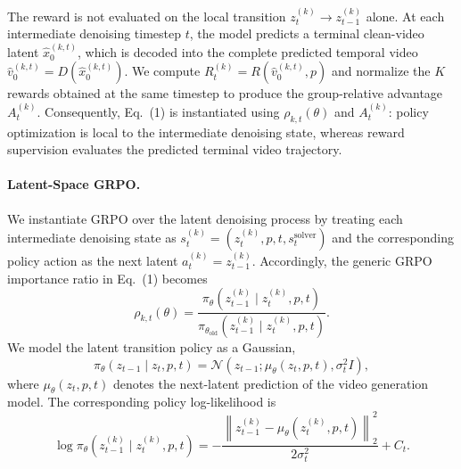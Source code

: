 \documentclass{article}
\begin{document}
The reward is not evaluated on the local transition
$z_t^{(k)}\rightarrow z_{t-1}^{(k)}$ alone. At each intermediate
denoising timestep $t$, the model predicts a terminal clean-video latent
$\hat{x}_0^{(k,t)}$, which is decoded into the complete predicted temporal
video $\hat{v}_0^{(k,t)}=D(\hat{x}_0^{(k,t)})$. We compute
$R_t^{(k)}=R(\hat{v}_0^{(k,t)},p)$ and normalize the $K$ rewards obtained
at the same timestep to produce the group-relative advantage
$A_t^{(k)}$. Consequently, Eq.~(1) is instantiated using
$\rho_{k,t}(\theta)$ and $A_t^{(k)}$: policy optimization is local to the
intermediate denoising state, whereas reward supervision evaluates the
predicted terminal video trajectory.

\paragraph{Latent-Space GRPO.}
We instantiate GRPO over the latent denoising process by treating each
intermediate denoising state as
$s_t^{(k)}=(z_t^{(k)},p,t,s_t^{\mathrm{solver}})$ and the corresponding
policy action as the next latent $a_t^{(k)}=z_{t-1}^{(k)}$.
Accordingly, the generic GRPO importance ratio in Eq.~(1) becomes
\begin{equation}
\rho_{k,t}(\theta)
=
\frac{
\pi_\theta
\left(
z_{t-1}^{(k)}
\mid
z_t^{(k)},p,t
\right)
}{
\pi_{\theta_{\mathrm{old}}}
\left(
z_{t-1}^{(k)}
\mid
z_t^{(k)},p,t
\right)
}.
\end{equation}
We model the latent transition policy as a Gaussian,
\begin{equation}
\pi_\theta(z_{t-1}\mid z_t,p,t)
=
\mathcal{N}
\left(
z_{t-1};
\mu_\theta(z_t,p,t),
\sigma_t^2 I
\right),
\end{equation}
where $\mu_\theta(z_t,p,t)$ denotes the next-latent prediction of the
video generation model. The corresponding policy log-likelihood is
\begin{equation}
\log \pi_\theta
\left(
z_{t-1}^{(k)}
\mid
z_t^{(k)},p,t
\right)
=
-\frac{
\left\|
z_{t-1}^{(k)}
-
\mu_\theta(z_t^{(k)},p,t)
\right\|_2^2
}{
2\sigma_t^2
}
+C_t.
\end{equation}
\end{document}

